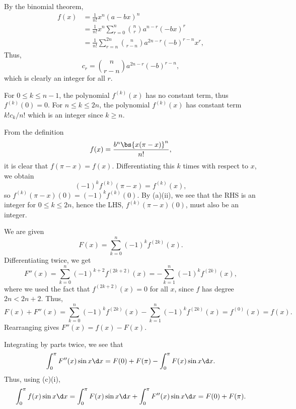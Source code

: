 \begin{solution}
    \begin{ppart}
        \begin{psubpart}
            By the binomial theorem,
            \begin{align*}
                f(x) &= \frac{1}{n!} x^n (a-bx)^n\\
                &= \frac1{n!} x^n \sum_{r = 0}^n \binom{n}{r} a^{n-r} (-bx)^r\\
                &= \frac1{n!} \sum_{r = n}^{2n} \binom{n}{r-n} a^{2n-r} (-b)^{r-n} x^{r},
            \end{align*}
            Thus, \[c_r = \binom{n}{r-n} a^{2n-r} (-b)^{r-n},\] which is clearly an integer for all $r$.
        \end{psubpart}
        \begin{psubpart}
            For $0 \leq k \leq n-1$, the polynomial $f^{(k)}(x)$ has no constant term, thus $f^{(k)}(0) = 0$. For $n \leq k \leq 2n$, the polynomial $f^{(k)}(x)$ has constant term $k! c_k / n!$ which is an integer since $k \geq n$.
        \end{psubpart}
    \end{ppart}
    \begin{ppart}
        From the definition \[f(x) = \frac{b^n \bs{x(\pi-x)}^n}{n!},\] it is clear that $f(\pi-x) = f(x)$. Differentiating this $k$ times with respect to $x$, we obtain \[(-1)^k f^{(k)}(\pi-x) = f^{(k)}(x),\] so $f^{(k)}(\pi-x)(0) = (-1)^k f^{(k)}(0)$. By (a)(ii), we see that the RHS is an integer for $0 \leq k \leq 2n$, hence the LHS, $f^{(k)}(\pi-x)(0)$, must also be an integer.
    \end{ppart}
    \begin{ppart}
        \begin{psubpart}
            We are given \[F(x) = \sum_{k = 0}^n (-1)^k f^{(2k)}(x).\] Differentiating twice, we get \[F''(x) = \sum_{k = 0}^{n} (-1)^{k+2} f^{(2k+2)}(x) = -\sum_{k = 1}^{n} (-1)^{k} f^{(2k)}(x),\] where we used the fact that $f^{(2k+2)}(x) = 0$ for all $x$, since $f$ has degree $2n < 2n+2$. Thus, \[F(x) + F''(x) = \sum_{k = 0}^n (-1)^k f^{(2k)}(x) -\sum_{k = 1}^{n} (-1)^{k} f^{(2k)}(x) = f^{(0)}(x) = f(x).\] Rearranging gives $F''(x) = f(x) - F(x)$.
        \end{psubpart}
        \begin{psubpart}
            Integrating by parts twice, we see that \[\int_0^\pi F''(x) \sin x \d x = F(0) + F(\pi) - \int_0^\pi F(x) \sin x \d x.\] Thus, using (c)(i), \[\int_0^\pi f(x) \sin x \d x = \int_0^\pi F(x) \sin x \d x + \int_0^\pi F''(x) \sin x \d x = F(0) + F(\pi).\]

\end{psubpart}
\end{ppart}
\end{solution}
